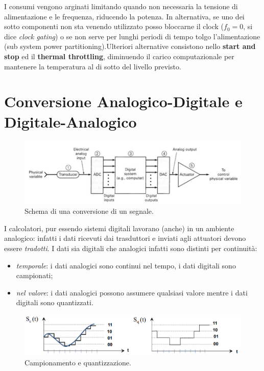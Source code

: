 \documentclass[
]{book}
\providecommand{\tightlist}{%
  \setlength{\itemsep}{0pt}\setlength{\parskip}{0pt}}
\begin{document}
I consumi vengono arginati limitando quando non necessaria la tensione
di alimentazione e le frequenza, riducendo la potenza. In alternativa,
se uno dei sotto componenti non sta venendo utilizzato posso bloccarne
il clock (\(f_0=0\), si dice \emph{clock gating}) o se non serve per
lunghi periodi di tempo tolgo l'alimentazione (sub system power
partitioning).\newline Ulteriori alternative consistono nello
\textbf{start and stop} ed il \textbf{thermal throttling}, diminuendo il
carico computazionale per mantenere la temperatura al di sotto del
livello previsto.

\chapter{Conversione Analogico-Digitale e
Digitale-Analogico}\label{conversione-analogico-digitale-e-digitale-analogico}

\begin{figure}
\centering
\includegraphics[width=0.6\linewidth,height=\textheight,keepaspectratio]{assets/imgs/convertitore_da.png}
\caption{Schema di una conversione di un segnale.}
\end{figure}

I calcolatori, pur essendo sistemi digitali lavorano (anche) in un
ambiente analogico: infatti i dati ricevuti dai trasduttori e inviati
agli attuatori devono essere \emph{tradotti}. I dati sia digitali che
analogici infatti sono distinti per continuità:

\begin{itemize}
\tightlist
\item
  \emph{temporale}: i dati analogici sono continui nel tempo, i dati
  digitali sono campionati;
\item
  \emph{nel valore}: i dati analogici possono assumere qualsiasi valore
  mentre i dati digitali sono quantizzati.
\end{itemize}

\begin{figure}
\centering
\includegraphics[width=0.7\linewidth,height=\textheight,keepaspectratio]{assets/imgs/camp_quant.png}
\caption{Campionamento e quantizzazione.}
\end{figure}
\end{document}
